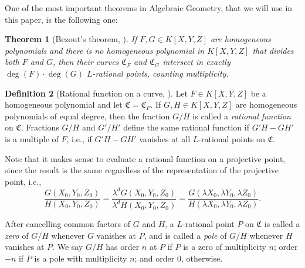 \documentclass[11pt, oneside]{amsart}
\newtheorem{thm}{Theorem}[section]
\theoremstyle{definition}
\newtheorem{defn}[thm]{Definition}
\theoremstyle{remark}
\numberwithin{equation}{section}
\begin{document}
One of the most important theorems in Algebraic Geometry, that we will use in this paper, is the following one:

\begin{thm}[Bezout's theorem, \cite{Wal00}] %
	If $F, G \in K[X, Y, Z]$ are homogeneous polynomials and there is no homogeneous polynomial in $K[X, Y, Z]$ that divides both $F$ and $G$, then their curves $\mathfrak C_F$ and $\mathfrak C_G$ intersect in exactly $\deg(F) \cdot \deg(G)$ $L$-rational points, counting multiplicity.
\end{thm}

%

\begin{defn}[Rational function on a curve, \cite{TVN07}]
	Let $F \in K[X, Y, Z]$ be a homogeneous polynomial and let $\mathfrak C = \mathfrak C_F$.
	If $G, H \in K[X, Y, Z]$ are homogeneous polynomials of equal degree, then the fraction $G/H$ is called a \emph{rational function} on $\mathfrak C$.
	Fractions $G/H$ and $G'/H'$ define the same rational function if $G'H - GH'$ is a multiple of $F$, i.e., if  $G'H - GH'$ vanishes at all $L$-rational points on $\mathfrak C$.
\end{defn}

	Note that it makes sense to evaluate a rational function on a projective point, since the result is the same regardless of the representation of the projective point, i.e.,  \[
		\frac{G(X_0, Y_0, Z_0)}{H(X_0, Y_0, Z_0)} = \frac{\lambda^d G(X_0, Y_0, Z_0)}{\lambda^d H(X_0, Y_0, Z_0)} = \frac{G(\lambda X_0, \lambda Y_0, \lambda Z_0)}{H(\lambda X_0, \lambda Y_0, \lambda Z_0)}.
	\]

	After cancelling common factors of $G$ and $H$, a $L$-rational point $P$ on $\mathfrak C$ is called a \emph{zero} of $G/H$ whenever $G$ vanishes at $P$, and is called a \emph{pole} of $G/H$ whenever $H$ vanishes at $P$.  
	We say $G/H$ has order $n$ at $P$ if $P$ is a zero of multiplicity $n$; order $-n$ if $P$ is a pole with multiplicity $n$; and order $0$, otherwise.
\end{document}
